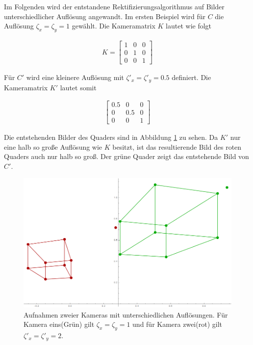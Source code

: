 Im Folgenden wird der entstandene Rektifizierungsalgorithmus auf Bilder unterschiedlicher Auflösung angewandt. Im ersten Beispiel wird für $C$ die Auflösung $\zeta_x = \zeta_y =1$ gewählt. Die Kameramatrix $K$ lautet wie folgt


\begin{gather}
	K = 
	\begin{bmatrix}
	1&0&0\\
	0&1&0\\
	0&0&1
	\end{bmatrix}
\end{gather}

Für $C'$ wird eine kleinere Auflösung mit $\zeta'_x = \zeta'_y = 0.5$ definiert. Die Kameramatrix $K'$ lautet somit

\begin{gather}
	\begin{bmatrix}
	0.5&0&0\\
	0&0.5&0\\
	0&0&1
	\end{bmatrix}
\end{gather} 


Die entstehenden Bilder des Quaders sind in Abbildung \ref{fig:AbbRecDifRes} zu sehen. Da $K'$ nur eine halb so große Auflösung wie $K$ besitzt, ist das resultierende Bild des roten Quaders auch nur halb so groß. Der grüne Quader zeigt das entstehende Bild von $C'$.
\pagebreak

\begin{figure}[!htb]
	\centering
	\includegraphics[width=.8\linewidth]{images/Rectification_one_different_Solutions.png}
	\caption[virtuelle Aufnahme mit unterschiedlichen Auflösung für die Rektifizierung]{Aufnahmen zweier Kameras mit unterschiedlichen Auflösungen. Für Kamera eins(Grün) gilt \ensuremath{\zeta_x = \zeta_y = 1}  und für Kamera zwei(rot) gilt \ensuremath{\zeta'_x = \zeta'_y= 2}.} 
	\label{fig:AbbRecDifRes}
\end{figure}


